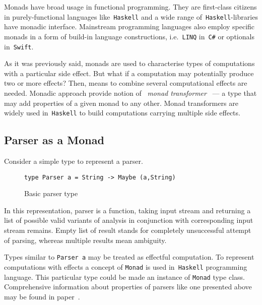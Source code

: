       Monads have broad usage in functional programming. They are first-class citizens
      in purely-functional languages like~\texttt{Haskell} and a wide range of~\texttt{Haskell}-libraries have monadic interface. Mainstream programming languages also
      employ specific monads in a form of build-in language constructions,
      i.e.~\texttt{LINQ} in~\texttt{C\#} or optionals in~\texttt{Swift}.

      As it was previously said, monads are used to characterise types of computations with a particular side effect. But what if a computation may
      potentially produce two or more effects? Then, means to combine several
      computational effects are needed. Monadic approach provide notion of
      ~\emph{monad transformer}~\cite{Liang:1995:MTM:199448.199528} --- a type that
      may add properties of a given monad to any other. Monad transformers are widely
      used in~\texttt{Haskell} to build computations carrying multiple side effects.


    \subsection{Parser as a Monad}

      Consider a simple type to represent a parser.

      \begin{figure}[h]
      \begin{lstlisting}
type Parser a = String -> Maybe (a,String)
      \end{lstlisting}
      \caption{Basic parser type}
      \label{listing:maybeParser}
      \end{figure}

      In this representation, parser is a
      function, taking input stream and returning a list of possible valid
      variants of analysis in conjunction with corresponding input stream
      remains. Empty list of result stands for completely unsuccessful attempt of
      parsing, whereas multiple results mean ambiguity.

      Types similar to \texttt{Parser a} may be treated as effectful computation.
      To represent computations with effects a concept of
      \texttt{Monad} is used in~\texttt{Haskell} programming language. This particular
      type could be made an instance of \texttt{Monad} type class.
      Comprehensive information about properties of parsers like one presented
      above may be found in paper~\cite{monParsing}.

